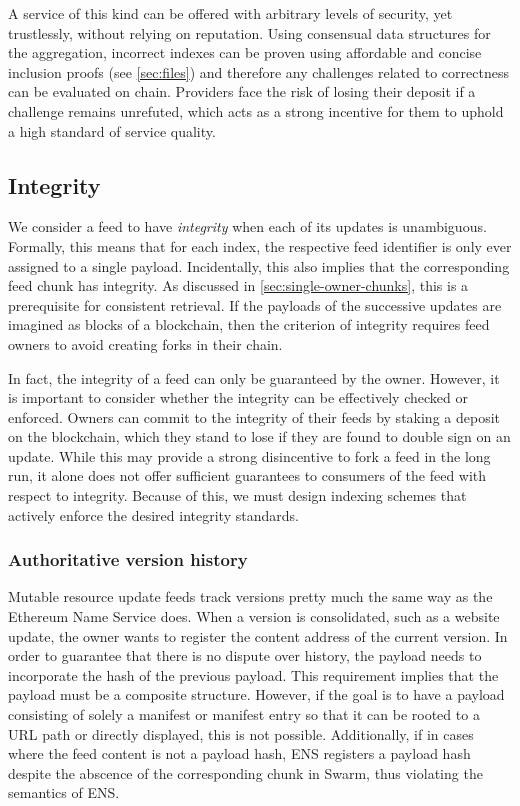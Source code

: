 A service of this kind can be offered with arbitrary levels of security, yet trustlessly, without relying on reputation. Using consensual data structures for the aggregation, incorrect indexes can be proven using affordable and concise inclusion proofs (see \ref{sec:files}) and therefore any challenges related to correctness can be evaluated on chain. Providers face the risk of losing their deposit if a challenge remains unrefuted, which acts as a strong incentive for them to uphold a high standard of service quality.

\subsection{Integrity \statusyellow}\label{sec:feed-integrity}

We consider a feed to have \emph{integrity} when each of its updates is unambiguous. Formally, this means that for each index, the respective feed identifier is only ever assigned to a single payload. Incidentally, this also implies that the corresponding feed chunk has integrity. As discussed in \ref{sec:single-owner-chunks}, this is a prerequisite for consistent retrieval. 
If the payloads of the successive updates are imagined as blocks of a blockchain, then the criterion of integrity requires feed owners to avoid creating forks in their chain. 

In fact, the integrity of a feed can only be guaranteed by the owner. However, it is important to consider whether the integrity can be effectively checked or enforced. Owners can commit to the integrity of their feeds by staking a deposit on the blockchain, which they stand to lose if they are found to double sign on an update. While this may provide a strong disincentive to fork a feed in the long run, it alone does not offer sufficient guarantees to consumers of the feed with respect to integrity. Because of this, we must design indexing schemes that actively enforce the desired integrity standards.

\subsubsection{Authoritative version history}

Mutable resource update feeds track versions pretty much the same way as the Ethereum Name Service does.  
When a version is consolidated, such as a website update, the owner wants to register the content address of the current version. In order to guarantee that there is no dispute over history, the payload needs to incorporate the hash of the previous payload. This requirement implies that the payload must be a composite structure. However, if the goal is to have a payload consisting of solely a manifest or manifest entry so that it can be rooted to a URL path or directly displayed, this is not possible. Additionally, if in cases where the feed content is not a payload hash, ENS registers a payload hash despite the abscence of the corresponding chunk in Swarm, thus violating the semantics of ENS.


